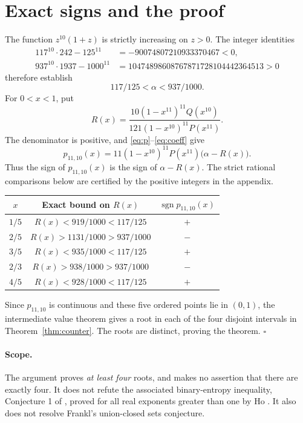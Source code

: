 \documentclass[11pt]{article}
\begin{document}
\section{Exact signs and the proof}
The function $z^{10}(1+z)$ is strictly increasing on $z>0$. The integer identities
\begin{align*}
117^{10}\cdot242-125^{11}&=-90074807210933370467<0,\\
937^{10}\cdot1937-1000^{11}&=10474898608767871728104442364513>0
\end{align*}
therefore establish
\begin{equation}\label{eq:alpha}
117/125<\alpha<937/1000.
\end{equation}
For $0<x<1$, put
\begin{equation}\label{eq:R}
R(x)=\frac{10(1-x^{11})^{11}Q(x^{10})}
 {121(1-x^{10})^{11}P(x^{11})}.
\end{equation}
The denominator is positive, and \eqref{eq:p}--\eqref{eq:coeff} give
\[
p_{11,10}(x)=11(1-x^{10})^{11}P(x^{11})\bigl(\alpha-R(x)\bigr).
\]
Thus the sign of $p_{11,10}(x)$ is the sign of $\alpha-R(x)$.
The strict rational comparisons below are certified by the positive integers
in the appendix.
\begin{center}
\begin{tabular}{ccc}
\toprule
$x$ & Exact bound on $R(x)$ & $\operatorname{sgn}p_{11,10}(x)$\\
\midrule
$1/5$ & $R(x)<919/1000<117/125$ & $+$\\
$2/5$ & $R(x)>1131/1000>937/1000$ & $-$\\
$3/5$ & $R(x)<935/1000<117/125$ & $+$\\
$2/3$ & $R(x)>938/1000>937/1000$ & $-$\\
$4/5$ & $R(x)<928/1000<117/125$ & $+$\\
\bottomrule
\end{tabular}
\end{center}
Since $p_{11,10}$ is continuous and these five ordered points lie in $(0,1)$,
the intermediate value theorem gives a root in each of the four disjoint
intervals in Theorem~\ref{thm:counter}. The roots are distinct, proving the theorem.
\hfill$\square$

\paragraph{Scope.}
The argument proves \emph{at least four} roots, and makes no assertion that
there are exactly four. It does not refute the associated binary-entropy
inequality, Conjecture 1 of \cite{Wakhare}, proved for all real exponents greater
than one by Ho \cite{Ho}. It also does not resolve Frankl's union-closed sets conjecture.
\end{document}
